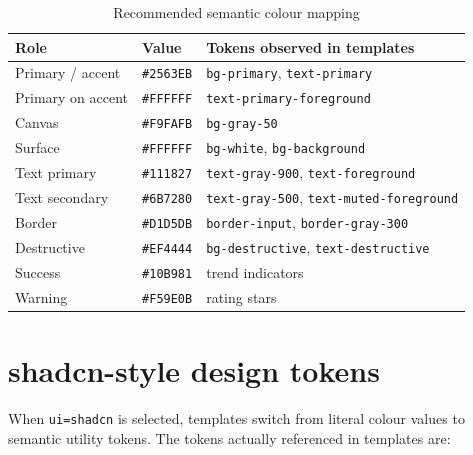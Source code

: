 \begin{table}[H]
\centering
\caption{Recommended semantic colour mapping}
\begin{tabular}{@{}L{4cm}L{2.6cm}L{7.4cm}@{}}
\toprule
\textbf{Role} & \textbf{Value} & \textbf{Tokens observed in templates} \\
\midrule
Primary / accent & \texttt{\#2563EB} & \texttt{bg-primary}, \texttt{text-primary} \\
Primary on accent & \texttt{\#FFFFFF} & \texttt{text-primary-foreground} \\
Canvas & \texttt{\#F9FAFB} & \texttt{bg-gray-50} \\
Surface & \texttt{\#FFFFFF} & \texttt{bg-white}, \texttt{bg-background} \\
Text primary & \texttt{\#111827} & \texttt{text-gray-900}, \texttt{text-foreground} \\
Text secondary & \texttt{\#6B7280} & \texttt{text-gray-500}, \texttt{text-muted-foreground} \\
Border & \texttt{\#D1D5DB} & \texttt{border-input}, \texttt{border-gray-300} \\
Destructive & \texttt{\#EF4444} & \texttt{bg-destructive}, \texttt{text-destructive} \\
Success & \texttt{\#10B981} & trend indicators \\
Warning & \texttt{\#F59E0B} & rating stars \\
\bottomrule
\end{tabular}
\end{table}

\section{shadcn-style design tokens}

When \texttt{ui=shadcn} is selected, templates switch from literal colour values to
semantic utility tokens. The tokens actually referenced in templates are:

